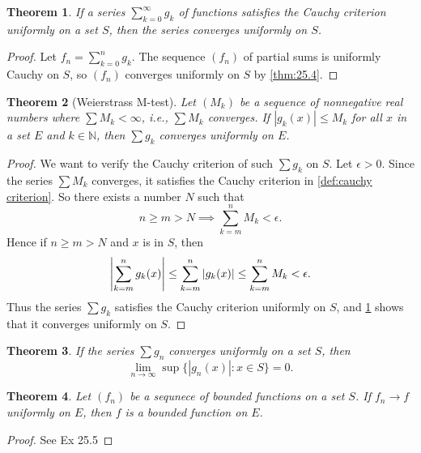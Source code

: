\documentclass[12pt, lettersize]{book}
\theoremstyle{plain}
\newtheorem{thm}{Theorem}[section]
\theoremstyle{definition}
\theoremstyle{remark}
\newcommand{\N}{\mathbb{N}}
\begin{document}
			\begin{thm}\label{thm:25.6}
			If a series $\sum_{k=0}^{\infty}g_k$ of functions satisfies the Cauchy criterion uniformly on a set $S$, then the
			series converges uniformly on $S$.
			\end{thm}
			\begin{proof}
			Let $f_n=\sum_{k=0}^{n}g_k$. The sequence $(f_n)$ of partial sums is uniformly Cauchy on $S$, so $(f_n)$ converges uniformly on $S$ by \ref{thm:25.4}.
			\end{proof}
			
			\begin{thm}[Weierstrass M-test]\label{thm:25.7}
			Let $(M_k)$ be a sequence of nonnegative real numbers where $\sum M_k<\infty$, i.e., $\sum M_k$ converges. If $|g_k(x)|\leq M_k$ for all $x$ in a set $E$ and $k\in\N$, then $\sum g_k$ converges uniformly on $E$.
			\end{thm}
			\begin{proof}
			We want to verify the Cauchy criterion of such $\sum g_k$ on $S$. Let $\epsilon>0$. Since the series $\sum M_k$ converges, it satisfies the Cauchy criterion in \ref{def:cauchy criterion}. So there exists a number $N$ such that
			\begin{displaymath}
				n\geq m>N\implies\sum_{k=m}^{n}M_k<\epsilon.
			\end{displaymath}
			Hence if $n\geq m>N$ and $x$ is in $S$, then
			\begin{displaymath}
				\abs{\sum_{k=m}^{n}g_k(x)}\leq\sum_{k=m}^{n}\abs{g_k(x)}\leq\sum_{k=m}^{n}M_k<\epsilon. 
			\end{displaymath}
			Thus the series $\sum g_k$ satisfies the Cauchy criterion uniformly on $S$, and \ref{thm:25.6} shows that it converges uniformly on $S$.
			\end{proof}
			
			\begin{thm}
				If the series $\sum g_n$ converges uniformly on a set $S$, then
				\begin{displaymath}
					\lim\limits_{n\rightarrow\infty}\sup\{|g_n(x)|: x\in S\}=0.
				\end{displaymath}
			\end{thm}
			
			\begin{thm}
				Let $(f_n)$ be a sequnece of bounded functions on a set $S$. If $f_n\rightarrow f$ uniformly on $E$, then $f$ is a bounded function on $E$.
			\end{thm}
			\begin{proof}
				See Ex 25.5
			\end{proof}
			
\end{document}
